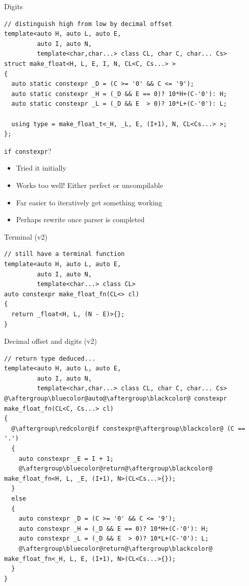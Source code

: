 \documentclass[xcolor=dvipsnames]{beamer}
\begin{document}
\begin{frame}[fragile]{Digits}
\begin{lstlisting}
// distinguish high from low by decimal offset
template<auto H, auto L, auto E,
         auto I, auto N,
         template<char,char...> class CL, char C, char... Cs>
struct make_float<H, L, E, I, N, CL<C, Cs...> >
{
  auto static constexpr _D = (C >= '0' && C <= '9');
  auto static constexpr _H = (_D && E == 0)? 10*H+(C-'0'): H;
  auto static constexpr _L = (_D && E  > 0)? 10*L+(C-'0'): L;

  using type = make_float_t<_H, _L, E, (I+1), N, CL<Cs...> >;
};
\end{lstlisting}
\end{frame}


\begin{frame}[fragile]{\texttt{if constexpr}?}
  \begin{itemize}
  \item Tried it initially \vspace{5mm}
  \item Works too well! Either perfect or uncompilable \vspace{5mm}
  \item Far easier to iteratively get something working \vspace{5mm}
  \item Perhaps rewrite once parser is completed \vspace{5mm}
  \end{itemize}
\end{frame}


\begin{frame}[fragile]{Terminal (v2)}
\begin{lstlisting}
// still have a terminal function
template<auto H, auto L, auto E,
         auto I, auto N,
         template<char...> class CL>
auto constexpr make_float_fn(CL<> cl)
{
  return _float<H, L, (N - E)>{};
}
\end{lstlisting}
\end{frame}


\begin{frame}[fragile]{Decimal offset and digits (v2)}
\begin{lstlisting}
// return type deduced...
template<auto H, auto L, auto E,
         auto I, auto N,
         template<char,char...> class CL, char C, char... Cs>
@\aftergroup\bluecolor@auto@\aftergroup\blackcolor@ constexpr make_float_fn(CL<C, Cs...> cl)
{
  @\aftergroup\redcolor@if constexpr@\aftergroup\blackcolor@ (C == '.')
  {
    auto constexpr _E = I + 1;
    @\aftergroup\bluecolor@return@\aftergroup\blackcolor@ make_float_fn<H, L, _E, (I+1), N>(CL<Cs...>{});
  }
  else
  {
    auto constexpr _D = (C >= '0' && C <= '9');
    auto constexpr _H = (_D && E == 0)? 10*H+(C-'0'): H;
    auto constexpr _L = (_D && E  > 0)? 10*L+(C-'0'): L;
    @\aftergroup\bluecolor@return@\aftergroup\blackcolor@ make_float_fn<_H, L, E, (I+1), N>(CL<Cs...>{});
  }
}
\end{lstlisting}
\end{frame}
\end{document}
